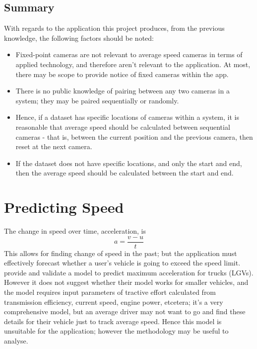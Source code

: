 \documentclass[11pt, a4paper, notitlepage]{report}
\begin{document}
\subsection{Summary}
With regards to the application this project produces, from the previous knowledge, the following factors should be noted:
\begin{itemize}
    \item Fixed-point cameras are not relevant to average speed cameras in terms of applied technology, and therefore aren't relevant to the application. At most, there may be scope to provide notice of fixed cameras within the app.
    \item There is no public knowledge of pairing between any two cameras in a system; they may be paired sequentially or randomly.
    \item Hence, if a dataset has specific locations of cameras within a system, it is reasonable that average speed should be calculated between sequential cameras - that is, between the current position and the previous camera, then reset at the next camera.
    \item If the dataset does not have specific locations, and only the start and end, then the average speed should be calculated between the start and end.
\end{itemize}

\section{Predicting Speed}
The change in speed over time, acceleration, is
\begin{equation}\label{eq:Accel}
    a = \frac{v - u}{t}
\end{equation}
This allows for finding change of speed in the past; but the application must effectively forecast whether a user's vehicle is going to exceed the speed limit. \citet{accelerationForecasting} provide and validate a model to predict maximum acceleration for trucks (LGVs). However it does not suggest whether their model works for smaller vehicles, and the model requires input parameters of tractive effort calculated from transmission efficiency, current speed, engine power, etcetera; it's a very comprehensive model, but an average driver may not want to go and find these details for their vehicle just to track average speed. Hence this model is unsuitable for the application; however the methodology may be useful to analyse.
\end{document}
